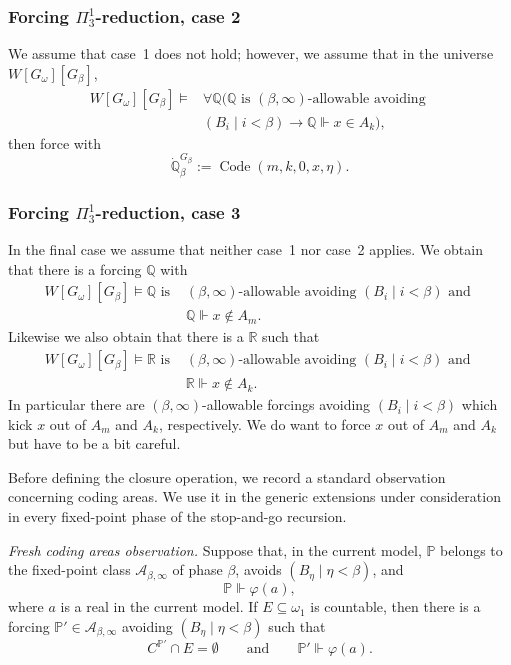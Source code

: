 \documentclass[a4paper,11pt]{article}
\newcommand{\forceP}{\mathbb{P}}
\newcommand{\forceQ}{\mathbb{Q}}
\newcommand{\forceR}{\mathbb{R}}
\begin{document}
\subsubsection{Forcing \texorpdfstring{$\Pi^1_3$}{Pi13}-reduction, case 2}
We assume that case~1 does not hold; however, we assume that in the universe $W[G_\omega][G_\beta]$,
\begin{align*}
W[G_\omega][G_\beta]\models&\forall\forceQ\bigl(\forceQ\text{ is }(\beta,\infty)\text{-allowable avoiding }\\
&(B_i\mid i<\beta)\rightarrow\forceQ\Vdash x\in A_k\bigr),
\end{align*}
then force with
\[
\dot{\forceQ}_\beta^{G_\beta}:=\operatorname{Code}(m,k,0,x,\eta).
\]

\subsubsection{Forcing \texorpdfstring{$\Pi^1_3$}{Pi13}-reduction, case 3}
In the final case we assume that neither case~1 nor case~2 applies. We obtain that there is a forcing $\forceQ$ with
\begin{align*}
W[G_\omega][G_\beta]\models\forceQ\text{ is }&(\beta,\infty)\text{-allowable avoiding $(B_i\mid i<\beta)$ and }\\
&\forceQ\Vdash x\notin A_m.
\end{align*}
Likewise we also obtain that there is a $\forceR$ such that
\begin{align*}
W[G_\omega][G_\beta]\models\forceR\text{ is }&(\beta,\infty)\text{-allowable avoiding $(B_i\mid i<\beta)$ and }\\
&\forceR\Vdash x\notin A_k.
\end{align*}
In particular there are $(\beta,\infty)$-allowable forcings avoiding $(B_i\mid i<\beta)$ which kick $x$ out of $A_m$ and $A_k$, respectively. We do want to force $x$ out of $A_m$ and $A_k$ but have to be a bit careful.

Before defining the closure operation, we record a standard observation concerning coding areas. We use it in the generic extensions under consideration in every fixed-point phase of the stop-and-go recursion.

\medskip

\noindent
\emph{Fresh coding areas observation.}
Suppose that, in the current model, $\forceP$ belongs to the fixed-point class $\mathcal A_{\beta,\infty}$ of phase $\beta$, avoids $(B_\eta\mid\eta<\beta)$, and
\[
\forceP\Vdash\varphi(a),
\]
where $a$ is a real in the current model. If $E\subseteq\omega_1$ is countable, then there is a forcing $\forceP'\in\mathcal A_{\beta,\infty}$ avoiding $(B_\eta\mid\eta<\beta)$ such that
\[
C^{\forceP'}\cap E=\emptyset
\qquad\text{and}\qquad
\forceP'\Vdash\varphi(a).
\]
\end{document}
